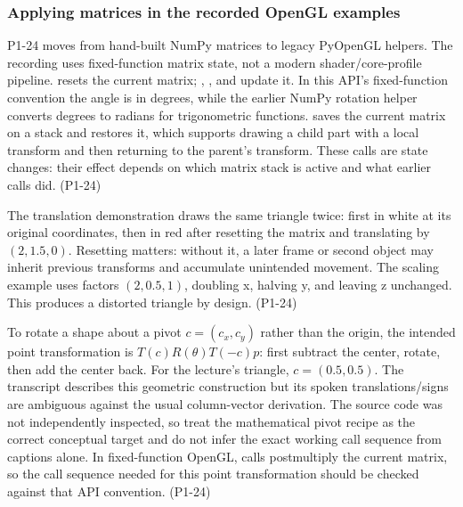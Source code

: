 \subsubsection{Applying matrices in the recorded OpenGL examples}\label{03-visual-computing-i-ch018-applying-matrices-in-the-recorded-opengl-examples}

\hypertarget{03-visual-computing-i-ch018-applying-matrices-in-the-recorded-opengl-examples}{}

P1-24 moves from hand-built NumPy matrices to legacy PyOpenGL helpers. The recording uses fixed-function matrix state, not a modern shader/core-profile pipeline.  resets the current matrix; , , and  update it. In this API's fixed-function convention the angle is in degrees, while the earlier NumPy rotation helper converts degrees to radians for trigonometric functions.  saves the current matrix on a stack and  restores it, which supports drawing a child part with a local transform and then returning to the parent's transform. These calls are state changes: their effect depends on which matrix stack is active and what earlier calls did. (P1-24)

The translation demonstration draws the same triangle twice: first in white at its original coordinates, then in red after resetting the matrix and translating by \((2,1.5,0)\). Resetting matters: without it, a later frame or second object may inherit previous transforms and accumulate unintended movement. The scaling example uses factors \((2,0.5,1)\), doubling x, halving y, and leaving z unchanged. This produces a distorted triangle by design. (P1-24)

To rotate a shape about a pivot \(c=(c_x,c_y)\) rather than the origin, the intended point transformation is \(T(c)R(\theta)T(-c)p\): first subtract the center, rotate, then add the center back. For the lecture's triangle, \(c=(0.5,0.5)\). The transcript describes this geometric construction but its spoken translations/signs are ambiguous against the usual column-vector derivation. The source code was not independently inspected, so treat the mathematical pivot recipe as the correct conceptual target and do not infer the exact working call sequence from captions alone. In fixed-function OpenGL, calls postmultiply the current matrix, so the call sequence needed for this point transformation should be checked against that API convention. (P1-24)

